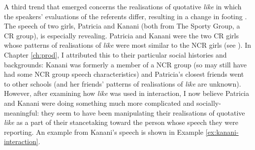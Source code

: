 A third trend that emerged concerns the realisations of quotative \textit{like} in which the speakers' evaluations of the referents differ, resulting in a change in footing \citep{goffman1981}.  The speech of two girls, Patricia and Kanani (both from The Sporty Group, a CR group), is especially revealing.  Patricia and Kanani were the two CR girls whose patterns of realisations of \textit{like} were most similar to the NCR girls (see  ).  In Chapter \ref{ch:prod}, I attributed this to their particular social histories and backgrounds: Kanani was formerly a member of a NCR group (so may still have had some NCR group speech characteristics) and Patricia's closest friends went to other schools (and her friends' patterns of realisations of \textit{like} are unknown).  However, after examining how \textit{like} was used in interaction, I now believe Patricia and Kanani were doing something much more complicated and socially-meaningful: they seem to have been manipulating their realisations of quotative \textit{like} as a part of their stancetaking toward the person whose speech they were reporting.  An example from Kanani's speech is shown in Example \ref{ex:kanani-interaction}.   


\label{ex:kanani-interaction}

